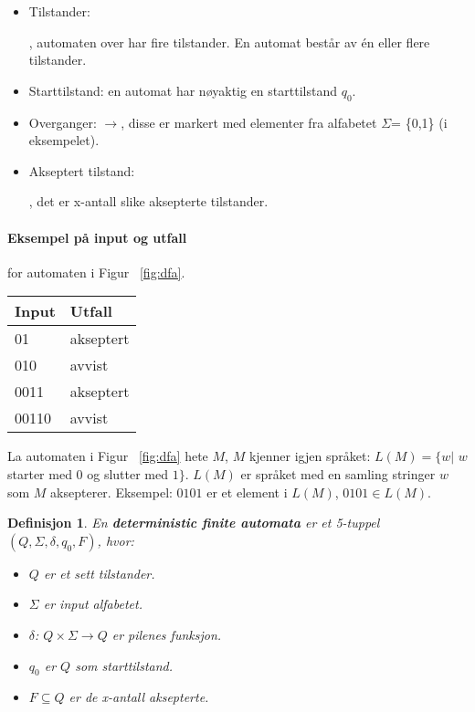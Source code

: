 \documentclass[11pt,a4paper]{article}
\newcommand\DrawCircleIns[2]{%
circle ({#2*cos(180/#1)})
}
\begin{document}
\begin{itemize}
\item{Tilstander: } 
, automaten over har fire tilstander. En automat består av én eller flere tilstander.
\item{Starttilstand: en automat har nøyaktig en starttilstand $q_0$.}
\item{Overganger: $\longrightarrow$, disse er markert med elementer fra alfabetet $\Sigma$= \{0,1\} (i eksempelet).}
\item{Akseptert tilstand: , det er x-antall slike aksepterte tilstander.}
\end{itemize}

\paragraph{Eksempel på input og utfall} for automaten i Figur ~\ref{fig:dfa}.
\begin{center}
\begin{tabular}{ l l }
	Input & Utfall\\
	\hline
	01 & akseptert\\
	010 & avvist\\
	0011 & akseptert\\
	00110 & avvist\\
\end{tabular}
\end{center}

La automaten i Figur ~\ref{fig:dfa} hete $M$, $M$ kjenner igjen språket: $L(M) = \{w |$  $w$ starter med $0$ og slutter med $1\}$. $L(M)$ er språket med en samling stringer $w$ som $M$ aksepterer. Eksempel: $0101$ er et element i $L(M)$, $0101 \in L(M)$.

\theoremstyle{mytheoremstyle}
\newtheorem{dfa}{Definisjon}[section]
\begin{dfa}
En \textbf{deterministic finite automata} er et 5-tuppel $(Q, \Sigma, \delta, q_0, F)$, hvor:

\begin{itemize}
	\item{$Q$ er et sett tilstander.}
	\item{$\Sigma$ er input alfabetet.}
	\item{$\delta$: $Q  \times \Sigma \rightarrow Q$ er pilenes funksjon.}
	\item{$q_0$ er $Q$ som starttilstand.}
	\item{$F \subseteq Q$ er de x-antall aksepterte.}
\end{itemize}
\end{dfa}
\end{document}
